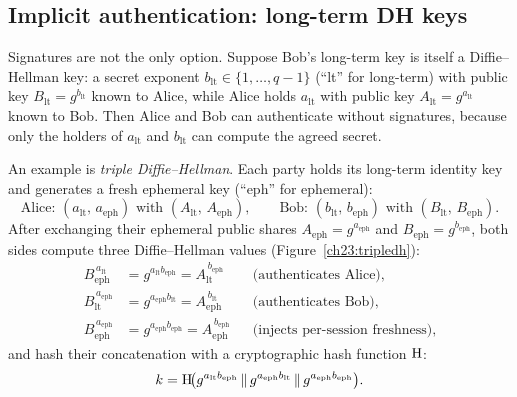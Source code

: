 \subsection{Implicit authentication: long-term DH keys}

Signatures are not the only option. Suppose Bob's long-term key is itself a
Diffie--Hellman key: a secret exponent $b_{\mathrm{lt}}\in\{1,\dots,q-1\}$
(``lt'' for long-term) with public key $B_{\mathrm{lt}}=g^{b_{\mathrm{lt}}}$
known to Alice, while Alice holds $a_{\mathrm{lt}}$ with public key
$A_{\mathrm{lt}}=g^{a_{\mathrm{lt}}}$ known to Bob. Then Alice and Bob can
authenticate without signatures, because only the holders of $a_{\mathrm{lt}}$
and $b_{\mathrm{lt}}$ can compute the agreed secret.

An example is \emph{triple Diffie--Hellman}. Each party holds its long-term
identity key and generates a fresh ephemeral key (``eph'' for ephemeral):
\[
  \text{Alice: } (a_{\mathrm{lt}},\, a_{\mathrm{eph}}) \text{ with } (A_{\mathrm{lt}},\, A_{\mathrm{eph}}), \qquad
  \text{Bob: } (b_{\mathrm{lt}},\, b_{\mathrm{eph}}) \text{ with } (B_{\mathrm{lt}},\, B_{\mathrm{eph}}).
\]
After exchanging their ephemeral public shares $A_{\mathrm{eph}}=g^{a_{\mathrm{eph}}}$
and $B_{\mathrm{eph}}=g^{b_{\mathrm{eph}}}$, both sides compute three
Diffie--Hellman values (Figure~\ref{ch23:tripledh}):
\begin{align*}
  B_{\mathrm{eph}}^{\,a_{\mathrm{lt}}} &= g^{a_{\mathrm{lt}} b_{\mathrm{eph}}} = A_{\mathrm{lt}}^{\,b_{\mathrm{eph}}} && \text{(authenticates Alice)}, \\
  B_{\mathrm{lt}}^{\,a_{\mathrm{eph}}} &= g^{a_{\mathrm{eph}} b_{\mathrm{lt}}} = A_{\mathrm{eph}}^{\,b_{\mathrm{lt}}} && \text{(authenticates Bob)}, \\
  B_{\mathrm{eph}}^{\,a_{\mathrm{eph}}} &= g^{a_{\mathrm{eph}} b_{\mathrm{eph}}} = A_{\mathrm{eph}}^{\,b_{\mathrm{eph}}} && \text{(injects per-session freshness)},
\end{align*}
and hash their concatenation with a cryptographic hash function $\operatorname{H}$:
\[
  k = \operatorname{H}\!\bigl(
    g^{a_{\mathrm{lt}} b_{\mathrm{eph}}} \,\|\,
    g^{a_{\mathrm{eph}} b_{\mathrm{lt}}} \,\|\,
    g^{a_{\mathrm{eph}} b_{\mathrm{eph}}}
  \bigr).
\]

